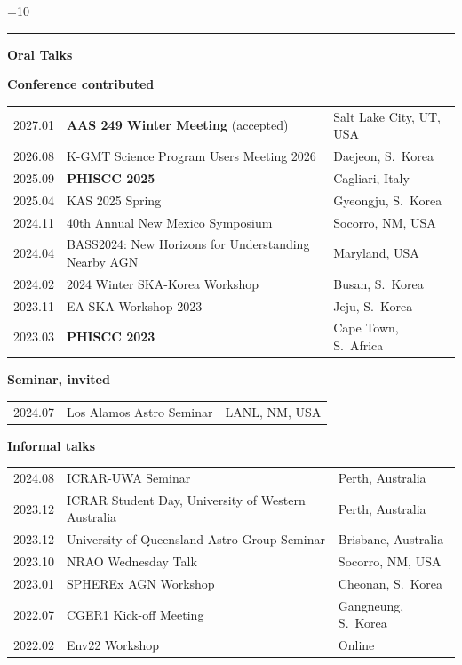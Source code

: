 \documentclass[12pt,letterpaper]{article}
\newcommand{\cvneedspace}[1]{%
  \dimen0=#1\relax
  \ifdim\pagegoal=\maxdimen\else
    \ifdim\dimen0>\dimexpr\pagegoal-\pagetotal\relax\newpage\fi
  \fi}
\newcommand{\cvsectionspace}{10\baselineskip}
\newcommand{\cvsection}[2][]{%
  \cvneedspace{\cvsectionspace}%
  \vspace{1.9ex}%
  \noindent{\color{darkgreen}\fontsize{13}{15.6}\selectfont\bfseries
    \hspace*{0.45em}\raisebox{0.05em}{\rotatebox[origin=c]{45}{\rule{0.5em}{0.5em}}}\hspace{0.3em}
    \textls[80]{\MakeUppercase{#2}}%
    \hfill{\normalfont\normalsize\strut #1}}\par\vspace{0.5ex}%
  {\color{darkgreen}\hrule height 1pt}\par\vspace{1.1ex}%
  \nopagebreak}
\newcommand{\cvsubsection}[1]{%
  \vspace{0.6ex}\noindent\hspace*{0.6em}%
  {\color{darkgreen}\raisebox{0.1em}{\rule{0.35em}{0.35em}}\hspace{0.5em}\textbf{#1}}%
  \par\vspace{0.6ex}\nopagebreak}
\newcommand{\cvsubsub}[1]{%
  \vspace{0.4ex}\noindent\hspace*{1.8em}%
  {\color{persongreen}\textbullet\hspace{0.45em}\textbf{#1}}%
  \par\vspace{0.3ex}\nopagebreak}
\begin{document}
\cvsection{Talks \& Posters}
\cvsubsection{Oral Talks}
\cvsubsub{Conference contributed}
\vspace{1mm}
{\normalsize
\begin{longtable}{@{}L{0.10\textwidth}L{0.58\textwidth}L{0.26\textwidth}@{}}
  2027.01 & \textbf{AAS 249 Winter Meeting} (accepted) & Salt Lake City, UT, USA \\
  2026.08 & K-GMT Science Program Users Meeting 2026 & Daejeon, S.\ Korea \\
  2025.09 & \textbf{PHISCC 2025} & Cagliari, Italy \\
  2025.04 & KAS 2025 Spring & Gyeongju, S.\ Korea \\
  2024.11 & 40th Annual New Mexico Symposium & Socorro, NM, USA \\
  2024.04 & BASS2024: New Horizons for Understanding Nearby AGN & Maryland, USA \\
  2024.02 & 2024 Winter SKA-Korea Workshop & Busan, S.\ Korea \\
  2023.11 & EA-SKA Workshop 2023 & Jeju, S.\ Korea \\
  2023.03 & \textbf{PHISCC 2023} & Cape Town, S.\ Africa \\
\end{longtable}}
\cvsubsub{Seminar, invited}
\vspace{0.5mm}
{\normalsize
\begin{longtable}{@{}L{0.10\textwidth}L{0.58\textwidth}L{0.26\textwidth}@{}}
  2024.07 & Los Alamos Astro Seminar & LANL, NM, USA \\
\end{longtable}}
\cvsubsub{Informal talks}
\vspace{0.5mm}
{\normalsize
\begin{longtable}{@{}L{0.10\textwidth}L{0.58\textwidth}L{0.26\textwidth}@{}}
  2024.08 & ICRAR-UWA Seminar & Perth, Australia \\
  2023.12 & ICRAR Student Day, University of Western Australia & Perth, Australia \\
  2023.12 & University of Queensland Astro Group Seminar & Brisbane, Australia \\
  2023.10 & NRAO Wednesday Talk & Socorro, NM, USA \\
  2023.01 & SPHEREx AGN Workshop & Cheonan, S.\ Korea \\
  2022.07 & CGER1 Kick-off Meeting & Gangneung, S.\ Korea \\
  2022.02 & Env22 Workshop & Online \\
\end{longtable}}
\end{document}
